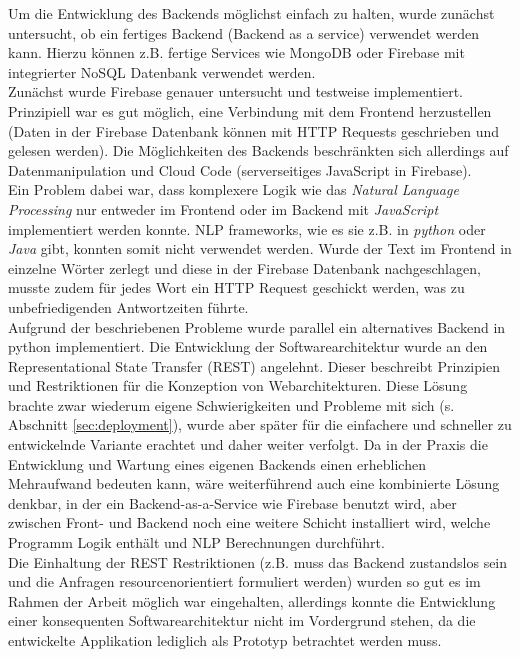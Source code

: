 Um die Entwicklung des Backends möglichst einfach zu halten, wurde zunächst untersucht, ob ein fertiges Backend (Backend as a service) verwendet werden kann. Hierzu können z.B. fertige Services wie MongoDB oder Firebase mit integrierter NoSQL Datenbank verwendet werden\cite{almootassem2017}.\\
Zunächst wurde Firebase genauer untersucht und testweise implementiert. Prinzipiell war es gut möglich, eine Verbindung mit dem Frontend herzustellen (Daten in der Firebase Datenbank können mit HTTP Requests geschrieben und gelesen werden). Die Möglichkeiten des Backends beschränkten sich allerdings auf Datenmanipulation und Cloud Code (serverseitiges JavaScript in Firebase).\\
Ein Problem dabei war, dass komplexere Logik wie das \textit{Natural Language Processing} nur entweder im Frontend oder im Backend mit \textit{JavaScript} implementiert werden konnte. NLP frameworks, wie es sie z.B. in \textit{python} oder \textit{Java} gibt, konnten somit nicht verwendet werden. Wurde der Text im Frontend in einzelne Wörter zerlegt und diese in der Firebase Datenbank nachgeschlagen, musste zudem für jedes Wort ein HTTP Request geschickt werden, was zu unbefriedigenden Antwortzeiten führte.\\

Aufgrund der beschriebenen Probleme wurde parallel ein alternatives Backend in python implementiert. Die Entwicklung der Softwarearchitektur wurde an den Representational State Transfer (REST) angelehnt. Dieser beschreibt Prinzipien und Restriktionen für die Konzeption von Webarchitekturen\cite{Fielding:2000:ASD:932295}. Diese Lösung brachte zwar wiederum eigene Schwierigkeiten und Probleme mit sich (s. Abschnitt \ref{sec:deployment}), wurde aber später für die einfachere und schneller zu entwickelnde Variante erachtet und daher weiter verfolgt. Da in der Praxis die Entwicklung und Wartung eines eigenen Backends einen erheblichen Mehraufwand bedeuten kann, wäre weiterführend auch eine kombinierte Lösung denkbar, in der ein Backend-as-a-Service wie Firebase benutzt wird, aber zwischen Front- und Backend noch eine weitere Schicht installiert wird, welche Programm Logik enthält und NLP Berechnungen durchführt.\\

Die Einhaltung der REST Restriktionen (z.B. muss das Backend zustandslos sein und die Anfragen resourcenorientiert formuliert werden) wurden so gut es im Rahmen der Arbeit möglich war eingehalten, allerdings konnte die Entwicklung einer konsequenten Softwarearchitektur nicht im Vordergrund stehen, da die entwickelte Applikation lediglich als Prototyp betrachtet werden muss.\\

